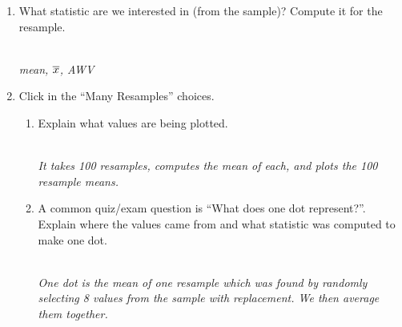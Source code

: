 \begin{enumerate}
\begin{enumerate}
      mimic what the computer does.  Which of these methods works?
      (Circle one.)
      \begin{enumerate}
      \item Select one card at random, leave it out, and select
        another card.  Continue until you use all the cards.
      \item Select one card at random and write down its
        value. Replace it, reshuffle, and select another.  Continue
        until you've written down eight  values. 
      \end{enumerate}
\begin{students}
        \vspace{.2cm}        
\end{students}
\begin{key}
\ \  \\
  {\it The second -- sampling With Replacement is what we are doing
    on the computer. The first way always gives the same resample
    mean -- they just change order. The second lets the resample mean vary.}
\end{key}

\item What statistic are we interested in (from the sample)?  Compute
  it for the resample. 
\begin{students}
        \vspace{1cm}        
\end{students}
\begin{key}
  \\{\it mean, $\overline{x}$, AWV}
\end{key}

\item  Click   in the ``Many Resamples'' choices.
  \begin{enumerate}
  \item  Explain  what values are being plotted.  
\begin{students}
        \vspace{2cm}        
\end{students}
\begin{key}
  \\{\it It takes  100 resamples, computes the mean of
    each, and plots the 100 resample means. }
\end{key}
  \item A common quiz/exam question is ``What does one dot
    represent?''. Explain where the values came from and what
    statistic was computed to make one dot. 
\begin{students}
        \vspace{2.5cm}        
\end{students}
\begin{key}
  \\{\it One dot is the mean of one resample which was found by
    randomly selecting 8  values from the sample with replacement. We
    then average them     together.}
\end{key}
\end{enumerate}


\end{enumerate}
\end{enumerate}
